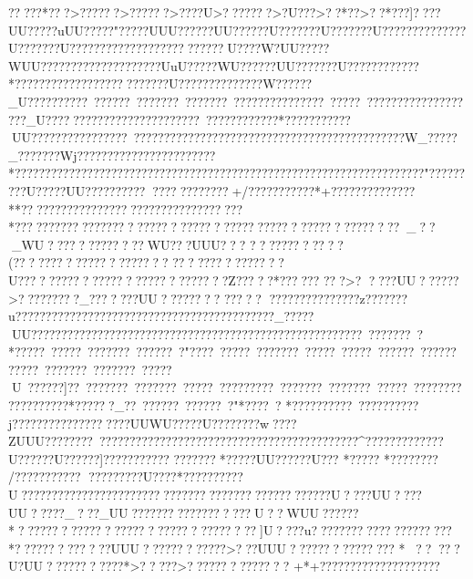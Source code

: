 {{{{{{{{{{{{{{{{{{{{{{{{{{{{{{{{{{{{{{{{{{{{{{{{{{{{{{{{{{{{{{{{{{{{{{{{{{{{{{{{{{{{{{{{{{{{{{{{{{{{{{{{{{{{{{{{{{{{{{{{{{{{{{{{{{{{{{{{{{{{{{{{{{{{{{{{{{{{{{{{{{{{{{{{{{{{{{{{{{{{{{{{{{{{{{{{{{{{{{{{{{{{{{{{{{{{{{{{{{{{{{{{{{{{{{{{{{{{{{{{{{{{{{{{{{{{{{{{{{{{{{{{{{{{{{{{{{{{{{{{{{{{{{{{{{{{{{{{{{{{{{{{{{{{{{{{{{{{{{{{{{{{{{{{{{{{{{{{{{{{{{{{{{{{{{{{{{{{{{{{{{{{{{{{{{{{{{{{{{{{{{{{{{{{{{{{{{{{{{{{{{{{{{{{{{{{{{{{{{{{{{{{{{{{{{{{{{{{{{{{{{{{{{{{{{{{{{{{{{{{{{{{{{{{{{{{{{{{{{{{{{{{{{{{{{{{{{{{{{{{{{{{{{{{{{{{{{{{{{{{{{{{{{{{{{{{{{{{{{{{{{{{{{{{{{{{{{{{{{{{{{{{{{{{{{{{{{{{{{{{{{{{{{{{{{{{{{{{{{{{{{{{{{{{{{{{{{{{{{{{{{{{????? *???>??????>??????>????U>???????>?U???>?? *??>??*???]????UU?????uUU?????"  ?????UUU??????UU??????}U???????U???????U??????????????U???????U?????????????????????????U????W?UU?????WUU????   ?????   ?????   ??????UuU?????}WU??????UU???????U????????????*?????????????????????????U???? ??????????W??????_U??????????~? ?????~???????~???????~???????????????~?????~???????????????????_U?????????????????????????~????????????*??????  ?????UU????????????????~?????????????????????????????????????????????W_?????_???????Wj???????????????????????*???????????????????????????? ????????????????????????????????????????"?????????U?????UU??????????????   ????????+/???????????*+??????????????**???????????????????????????????????*???????????????????????????????????????????????????????_??_WU??  ???????????WU???UUU???   ?????????   ??? (???? ????????????????? 
???? ???????????U?????????????????????????????Z?????*??????  ???>?   
????UU??????>?????????_???????UU????????
?????  
???????????????z???????u???????????????????????????????????????????_?????UU????   ?????  ??????  ?????? ??????????????????????????????????~???????~?*?????~?????~???????~? ?????~? "????~?  ????~???????~?  ????~?  ????~? ?????~? ?????~?????~???????~???????~?????U~??????]??~???????~???????~?????~?????????~???????~???????~?????~??????????????????*??????_??~? ?????~? ?????~?"*????~?  
*??????????~??????????j???????????????????UUWU?????U????????w????ZUUU????????~???????????????????????????????????????????^?????????????U??????U??????]???????????
???????  *?????UU??????U???
*?????  
*???????? 
/???????????
?????????U????*??????????U???????????????????????????????????????????}??????U????UU????UU?????_???_UU??????????????????U??WUU??????*?????????????????????????????????]U????u???????????  ???? ??????  *????  ????  ?????UUU????????????>???UUU???????????????
*??  ???U?UU???????????*>?????>??????????????
+*+????????????????????
}}}}}}}}}}}}}}}}}}}}}}}}}}}}}}}}}}}}}}}}}}}}}}}}}}}}}}}}}}}}}}}}}}}}}}}}}}}}}}}}}}}}}}}}}}}}}}}}}}}}}}}}}}}}}}}}}}}}}}}}}}}}}}}}}}}}}}}}}}}}}}}}}}}}}}}}}}}}}}}}}}}}}}}}}}}}}}}}}}}}}}}}}}}}}}}}}}}}}}}}}}}}}}}}}}}}}}}}}}}}}}}}}}}}}}}}}}}}}}}}}}}}}}}}}}}}}}}}}}}}}}}}}}}}}}}}}}}}}}}}}}}}}}}}}}}}}}}}}}}}}}}}}}}}}}}}}}}}}}}}}}}}}}}}}}}}}}}}}}}}}}}}}}}}}}}}}}}}}}}}}}}}}}}}}}}}}}}}}}}}}}}}}}}}}}}}}}}}}}}}}}}}}}}}}}}}}}}}}}}}}}}}}}}}}}}}}}}}}}}}}}}}}}}}}}}}}}}}}}}}}}}}}}}}}}}}}}}}}}}}}}}}}}}}}}}}}}}}}}}}}}}}}}}}}}}}}}}}}}}}}}}}}}}}}}}}}}}}}}}}}}}}}}}}}}}}}}}}}}}}}}}}}}}}}}}}}}}}}}}}}}}}}}}}}}}}}}}}}}}}}}}}}}}}}}}}}}}}}}}}}
